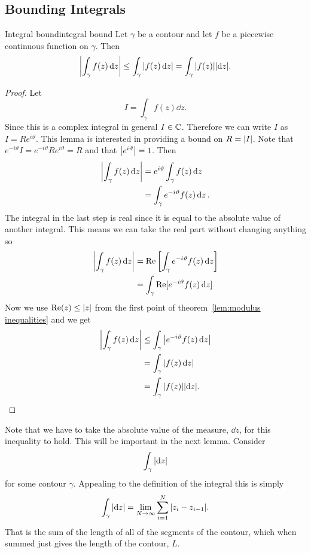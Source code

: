 \documentclass{article}
\begin{document}
    \subsection{Bounding Integrals}
    \begin{lemma}{Integral bound}{integral bound}
        Let \(\gamma\) be a contour and let \(f\) be a piecewise continuous function on \(\gamma\).
        Then
        \[\abs{\int_{\gamma} f(z) \dd{z}} \le \int_{\gamma} \abs{f(z) \dd{z}} = \int_{\gamma} \abs{f(z)}\abs{\dd{z}}.\]
    \end{lemma}
    \begin{proof}
        Let
        \[I = \int_\gamma f(z) \dd{z}.\]
        Since this is a complex integral in general \(I\in\mathbb{C}\).
        Therefore we can write \(I\) as \(I = Re^{i\vartheta}\).
        This lemma is interested in providing a bound on \(R = \abs{I}\).
        Note that \(e^{-i\vartheta}I = e^{-i\vartheta}Re^{i\vartheta} = R\) and that \(\abs{e^{i\vartheta}} = 1\).
        Then
        \begin{align*}
            \abs{\int_{\gamma} f(z) \dd{z}} &= e^{i\vartheta} \int_\gamma f(z) \dd{z}\\
            &= \int_{\gamma} e^{-i\vartheta} f(z) \dd{z}.
        \end{align*}
        The integral in the last step is real since it is equal to the absolute value of another integral.
        This means we can take the real part without changing anything so
        \begin{align*}
            \abs{\int_{\gamma} f(z) \dd{z}} &= \Re\left[\int_\gamma e^{-i\vartheta} f(z)\dd{z}\right]\\
            &= \int_{\gamma} \Re[e^{-i\vartheta} f(z)\dd{z}]
        \end{align*}
        Now we use \(\Re(z) \le \abs{z}\) from the first point of theorem~\ref{lem:modulus inequalities} and we get
        \begin{align*}
            \abs{\int_{\gamma} f(z) \dd{z}} &\le \int_\gamma \abs{e^{-i\vartheta}f(z)\dd{z}}\\
            &= \int_{\gamma} \abs{f(z) \dd{z}}\\
            &= \int_{\gamma} \abs{f(z)} \abs{\dd{z}}.
        \end{align*}
    \end{proof}
    Note that we have to take the absolute value of the measure, \(\dd{z}\), for this inequality to hold.
    This will be important in the next lemma.
    Consider
    \[\int_{\gamma} \abs{\dd{z}}\]
    for some contour \(\gamma\).
    Appealing to the definition of the integral this is simply
    \[\int_{\gamma} \abs{\dd{z}} = \lim_{N\to\infty} \sum_{i=1}^{N}\abs{z_{i} - z_{i-1}}.\]
    That is the sum of the length of all of the segments of the contour, which when summed just gives the length of the contour, \(L\).
    
\end{document}

